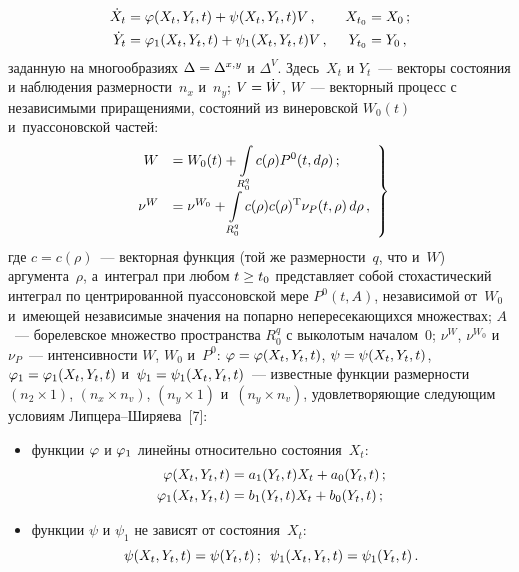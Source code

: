 \begin{multicols}{2}
\noindent
    \begin{alignat}{2}
    \dot X_t &=\vrp (X_t, Y_t, t) + \psi (X_t, Y_t, t) V\,, &\ X_{t_0} &= X_0\,;\label{e1-sin}\\
   \dot Y_t &=\vrp_1 (X_t, Y_t, t) + \psi_1 (X_t, Y_t, t) V\,, &\ Y_{t_0}& = Y_0\,,\label{e2-sin}
   \end{alignat}
заданную на многообразиях $\Delta \hm= \Delta^{x,y}$ и $\Delta^V$. Здесь~$X_t$ и $Y_t$~--- векторы состояния и наблюдения размерности~$n_x$ и~$n_y$; $V\hm= \dot W$, $W$~--- векторный процесс с независимыми приращениями, состояний из винеровской $W_0(t)$ и~пуассоновской частей:
    \begin{equation}
     \left.
     \begin{array}{rl}
     W&= W_0 (t) +\displaystyle \int\limits_{R_0^q} c(\rho) P^0 (t, d\rho)\,;\\[6pt]
     \nu^W &= \nu^{W_0} + \displaystyle \int\limits_{R_0^q} c(\rho) c(\rho)^{\mathrm{T}} \nu_P (t, \rho)\, d\rho\,,
     \end{array}
     \right\}
     \label{e3-sin}
     \end{equation}
где $c=c(\rho)$~--- векторная функция (той же размерности~$q$, что и~$W$) аргумента~$\rho$, а~интеграл при любом $t\hm\ge t_0$ представляет собой стохастический интеграл по центрированной пуассоновской мере  $P^0 (t, A)$, независимой от~$W_0$  и~име\-ющей независимые значения на попарно непересекающихся множествах;  $A$~--- борелевское множество пространства $R_0^q$ с выколотым началом~$0$; $\nu^W$, $\nu^{W_0}$ и~$\nu_P$~--- интенсивности $W$, $W_0$ и~$P^0$:
$\vrp\hm=\vrp (X_t, Y_t, t)$, $\psi\hm=\psi (X_t, Y_t, t)$, $\vrp_1\hm=\vrp_1 (X_t, Y_t, t)$ и~$\psi_1\hm=\psi_1 (X_t, Y_t, t)$~--- известные функции раз\-мер\-ности $(n_2\times 1)$, $(n_x\times n_v)$, $(n_y \times 1)$ и~$(n_y\times n_v)$, удовлетворяющие следующим условиям Лип\-це\-ра--Ши\-ря\-ева~[7]:
\begin{itemize}
\item  функции $\varphi$ и $\varphi_1$ линейны относительно состояния~$X_t$:
    \begin{align*}
    \varphi (X_t, Y_t, t) &= a_1 (Y_t, t) X_t + a_0 (Y_t, t)\,;\\
    \varphi_1 (X_t, Y_t, t) &= b_1 (Y_t, t) X_t + b_0 (Y_t, t)\,;
\end{align*}

\item функции $\psi$ и $\psi_1$  не зависят от состояния~$X_t$:
    $$
    \psi (X_t, Y_t, t) = \psi (Y_t, t) \,;\enskip \psi_1 (X_t, Y_t, t) = \psi_1  (Y_t, t)\,.
    $$
\end{itemize}


\end{multicols}
